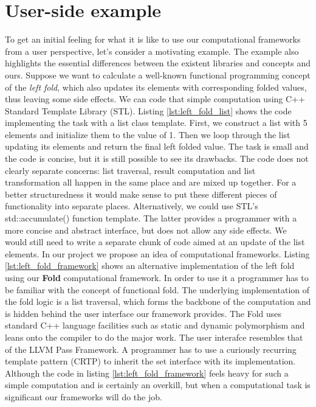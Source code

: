 \section{User-side example}
\label{frameworks_user_example}
\quad To get an initial feeling for what it is like to use our computational frameworks from a user perspective, let's consider a motivating example. The example also highlights the essential differences between the existent libraries and concepts and ours.\newline\null
\quad Suppose we want to calculate a well-known functional programming concept of the \textit{left fold}, which also updates its elements with corresponding folded values, thus leaving some side effects. We can code that simple computation using C++ Standard Template Library (STL). Listing \ref{lst:left_fold_list} shows the code implementing the task with a list class template. First, we construct a list with 5 elements and initialize them to the value of 1. Then we loop through the list updating its elements and return the final left folded value. The task is small and the code is concise, but it is still possible to see its drawbacks. The code does not clearly separate concerns: list traversal, result computation and list transformation all happen in the same place and are mixed up together. For a better structuredness it would make sense to put these different pieces of functionality into separate places. Alternatively, we could use STL's std::accumulate() function template. The latter provides a programmer with a more concise and abstract interface, but does not allow any side effects. We would still need to write a separate chunk of code aimed at an update of the list elements.\newline\null 
\quad In our project we propose an idea of computational frameworks. Listing \ref{lst:left_fold_framework} shows an alternative implementation of the left fold using our \textbf{Fold} computational framework. In order to use it a programmer has to be familiar with the concept of functional fold. The underlying implementation of the fold logic is a list traversal, which forms the backbone of the computation and is hidden behind the user interface our framework provides. The Fold uses standard C++ language facilities such as static and dynamic polymorphism and leans onto the compiler to do the major work. The user interafce resembles that of the LLVM Pass Framework. A programmer has to use a curiously recurring template pattern (CRTP) to inherit the set interface with its implementation. Although the code in listing \ref{lst:left_fold_framework} feels heavy for such a simple computation and is certainly an overkill, but when a computational task is significant our frameworks will do the job.

